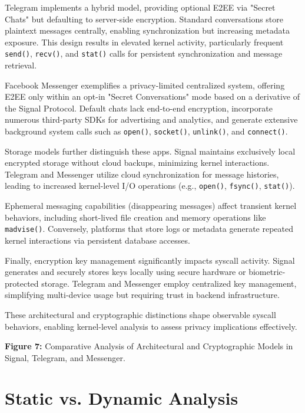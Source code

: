 \documentclass[a4paper,12pt]{report}
\begin{document}
Telegram implements a hybrid model, providing optional E2EE via "Secret Chats" but defaulting to server-side encryption. Standard conversations store plaintext messages centrally, enabling synchronization but increasing metadata exposure. This design results in elevated kernel activity, particularly frequent \texttt{send()}, \texttt{recv()}, and \texttt{stat()} calls for persistent synchronization and message retrieval.

Facebook Messenger exemplifies a privacy-limited centralized system, offering E2EE only within an opt-in "Secret Conversations" mode based on a derivative of the Signal Protocol. Default chats lack end-to-end encryption, incorporate numerous third-party SDKs for advertising and analytics, and generate extensive background system calls such as \texttt{open()}, \texttt{socket()}, \texttt{unlink()}, and \texttt{connect()}.

Storage models further distinguish these apps. Signal maintains exclusively local encrypted storage without cloud backups, minimizing kernel interactions. Telegram and Messenger utilize cloud synchronization for message histories, leading to increased kernel-level I/O operations (e.g., \texttt{open()}, \texttt{fsync()}, \texttt{stat()}).

Ephemeral messaging capabilities (disappearing messages) affect transient kernel behaviors, including short-lived file creation and memory operations like \texttt{madvise()}. Conversely, platforms that store logs or metadata generate repeated kernel interactions via persistent database accesses.

Finally, encryption key management significantly impacts syscall activity. Signal generates and securely stores keys locally using secure hardware or biometric-protected storage. Telegram and Messenger employ centralized key management, simplifying multi-device usage but requiring trust in backend infrastructure.

These architectural and cryptographic distinctions shape observable syscall behaviors, enabling kernel-level analysis to assess privacy implications effectively.

\textbf{Figure 7:} Comparative Analysis of Architectural and Cryptographic Models in Signal, Telegram, and Messenger.

\section{Static vs. Dynamic Analysis}
\end{document}
